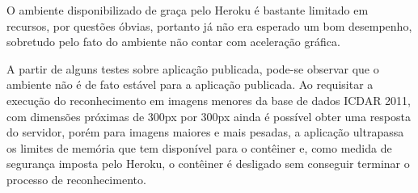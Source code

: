 O ambiente disponibilizado de graça pelo Heroku é bastante limitado em recursos, por questões óbvias, portanto já não era esperado 
um bom desempenho, sobretudo pelo fato do ambiente não contar com aceleração gráfica.

A partir de alguns testes sobre aplicação publicada, pode-se observar que o ambiente não é de fato estável para a aplicação publicada. 
Ao requisitar a execução do reconhecimento em imagens menores da base de dados ICDAR 2011, com dimensões próximas de 300px por 300px 
ainda é possível obter uma resposta do servidor, porém para imagens maiores e mais pesadas, a aplicação ultrapassa os limites de 
memória que tem disponível para o contêiner e, como medida de segurança imposta pelo Heroku, o contêiner é desligado sem conseguir 
terminar o processo de reconhecimento.
